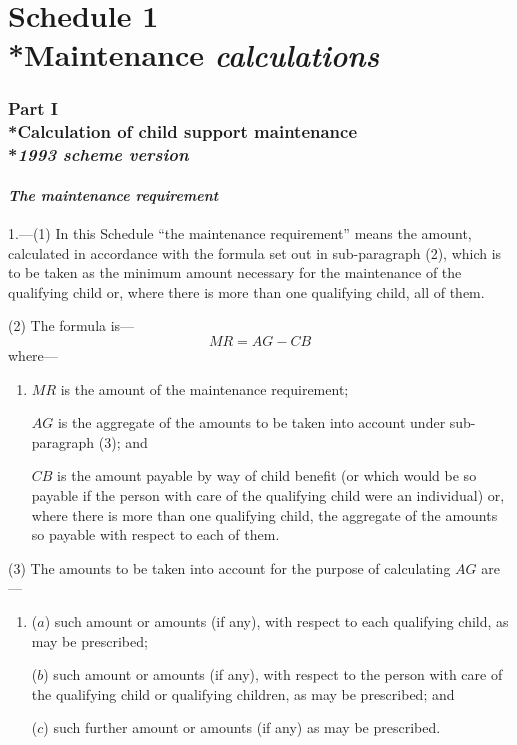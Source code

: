 \documentclass[12pt,a4paper]{article}
\begin{document}
\bigskip

\small

\part[Schedule 1 --- Maintenance 
\emph{calculations}  %
]{Schedule 1\\*Maintenance 
\emph{calculations}  %
}

\section[Part I --- Calculation of child support maintenance --- \emph{1993 scheme version}]{Part I\\*Calculation of child support maintenance\\*\emph{1993 scheme version}}

\renewcommand\parthead{ --- Schedule 1 Part I}

\subsection*{\itshape The maintenance requirement}

1.---(1) In this Schedule “the maintenance requirement” means the amount, calculated in accordance with the formula set out in sub-paragraph (2), which is to be taken as the minimum amount necessary for the maintenance of the qualifying child or, where there is more than one qualifying child, all of them.

(2) The formula is—
\[
MR = AG - CB
\]
where—
\begin{enumerate}\item[]
    $MR$ is the amount of the maintenance requirement;

    $AG$ is the aggregate of the amounts to be taken into account under sub-paragraph (3); and

    $CB$ is the amount payable by way of child benefit (or which would be so payable if the person with care of the qualifying child were an individual) or, where there is more than one qualifying child, the aggregate of the amounts so payable with respect to each of them. 
\end{enumerate}

(3) The amounts to be taken into account for the purpose of calculating $AG$ are—
\begin{enumerate}\item[]
($a$) such amount or amounts (if any), with respect to each qualifying child, as may be prescribed;

($b$) such amount or amounts (if any), with respect to the person with care of the qualifying child or qualifying children, as may be prescribed; and

($c$) such further amount or amounts (if any) as may be prescribed.
\end{enumerate}
\end{document}
